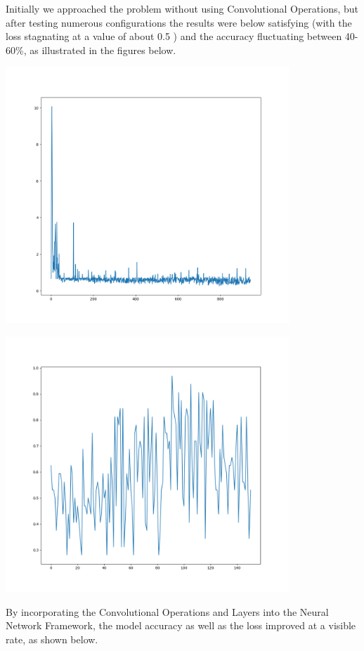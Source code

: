 Initially we approached the problem without using Convolutional Operations, but after testing numerous configurations
the results were below satisfying (with the loss stagnating at a value of about 0.5 ) and the accuracy fluctuating between 40-60\%, as illustrated in the figures below.


\begin{center}
	\centering
	\includegraphics[width = 4.2in]{images/badmetricspng.png}
	\centerline{}
\label{bad_metrics}
\end{center}


\begin{center}
	\centering
	\includegraphics[width = 4.2in]{images/badacc.png}
	\centerline{}
\label{bad_metrics2}
\end{center}
By incorporating the Convolutional Operations and Layers into the Neural Network Framework, the model accuracy as well
as the loss improved at a visible rate, as shown below.


